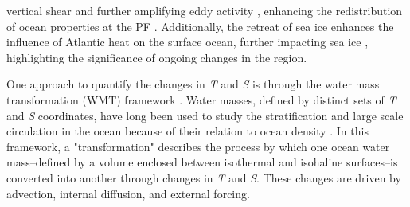 \documentclass[draft]{agujournal2019}
\begin{document}
vertical shear and further amplifying eddy activity \cite{Shao2023,li2024eddy}, enhancing the redistribution of ocean properties at the PF \cite{Porter2020}. Additionally, the retreat of sea ice enhances the influence of Atlantic heat on the surface ocean, further impacting sea ice \cite{Dorr2024}, highlighting the significance of ongoing changes in the region.




One approach to quantify the changes in \emph{T} and \emph{S} is through the water mass transformation (WMT) framework \cite{Walin_1977,Walin1982}. Water masses, defined by distinct sets of \emph{T} and \emph{S} coordinates, have long been used to study the stratification and large scale circulation in the ocean because of their relation to ocean density \cite{sverdrup1942}. In this framework, a "transformation" describes the process by which one ocean water mass--defined by a volume enclosed between isothermal and isohaline surfaces--is converted into another through changes in \emph{T} and \emph{S}. These changes are driven by advection, internal diffusion, and external forcing.
\end{document}
